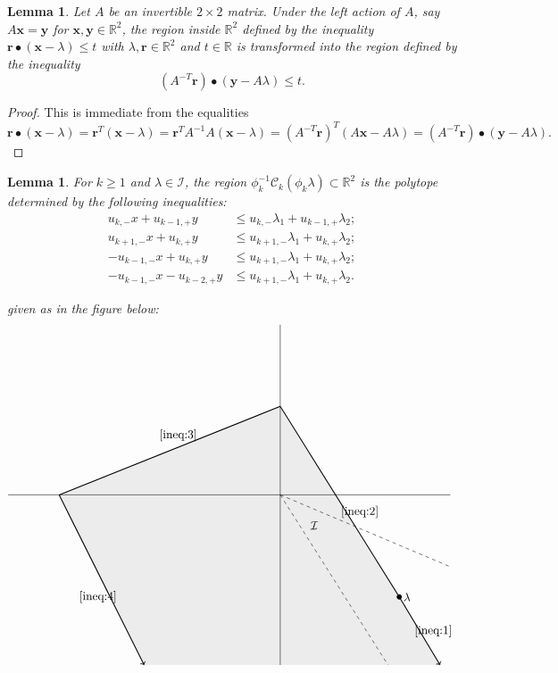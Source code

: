 \documentclass{amsart}
\newtheorem{lemma}[theorem]{Lemma}
\numberwithin{theorem}{section}
\newcommand{\bfr}{\boldsymbol{r}}
\newcommand{\bfx}{\boldsymbol{x}}
\newcommand{\bfy}{\boldsymbol{y}}
\newcommand{\cC}{\mathcal{C}}
\newcommand{\cI}{\mathcal{I}}
\newcommand{\RR}{\mathbb{R}}
\begin{document}
  \begin{lemma}
    \label{le:transformed inequalities}
    Let $A$ be an invertible $2\times 2$ matrix.
    Under the left action of $A$, say $A\bfx=\bfy$ for $\bfx,\bfy\in\RR^2$, the region inside $\RR^2$ defined by the inequality $\bfr\bullet(\bfx-\lambda)\le t$ with $\lambda,\bfr\in\RR^2$ and $t\in\RR$ is transformed into the region defined by the inequality \[(A^{-T}\bfr)\bullet(\bfy-A\lambda)\le t.\]
  \end{lemma}
  \begin{proof}
    This is immediate from the equalities
    \[\bfr\bullet(\bfx-\lambda)=\bfr^T(\bfx-\lambda)=\bfr^TA^{-1}A(\bfx-\lambda)=(A^{-T}\bfr)^T(A\bfx-A\lambda)=(A^{-T}\bfr)\bullet(\bfy-A\lambda).\]
  \end{proof}
  
  \begin{lemma}
    For $k\ge1$ and $\lambda\in\cI$, the region $\phi_k^{-1}\cC_k(\phi_k\lambda)\subset\RR^2$ is the polytope determined by the following inequalities:
    \begin{align}
      \label{ineq:1} u_{k,-}x+u_{k-1,+}y &\le u_{k,-}\lambda_1+u_{k-1,+}\lambda_2;\\
      \label{ineq:2} u_{k+1,-}x+u_{k,+}y &\le u_{k+1,-}\lambda_1+u_{k,+}\lambda_2;\\
      \label{ineq:3} -u_{k-1,-}x+u_{k,+}y &\le u_{k+1,-}\lambda_1+u_{k,+}\lambda_2;\\
      \label{ineq:4} -u_{k-1,-}x-u_{k-2,+}y &\le u_{k+1,-}\lambda_1+u_{k,+}\lambda_2.
    \end{align}
    
    given as in the figure below:
    \[
      \begin{tikzpicture}
        \filldraw[color=lightgray!30] (47/10,-5) --(3.5,-3) -- (0,26/10) -- (-26/4,0) -- (-16/4,-5);
        \draw[-] (-8,0) -- (5,0);
        \draw[-] (0,-5) -- (0,5);
        \draw[dashed] (0,0) -- (5,-2.113);
        \draw[dashed] (0,0) -- (3.17,-5);
        \node at (1,-0.9) {$\cI$};
        \draw[fill=black] (3.5,-3) circle (2pt);
        \node[right] at (3.5,-3) {$\lambda$};
        \draw[->,thick] (3.5,-3) -- (47/10,-5);
        \draw[-,thick] (3.5,-3) -- (0,26/10);
        \draw[-,thick] (0,26/10) -- (-26/4,0);
        \draw[->,thick] (-26/4,0) -- (-16/4,-5);
        \node at (4.5,-4) {\eqref{ineq:1}};
        \node at (2.34,-0.5) {\eqref{ineq:2}};
        \node at (-3,1.75) {\eqref{ineq:3}};
        \node at (-5.36,-3) {\eqref{ineq:4}};
      \end{tikzpicture}
    \]
  \end{lemma}
\end{document}

